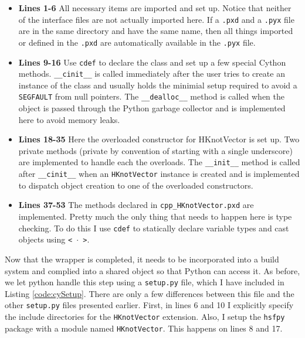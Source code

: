     

    \begin{itemize}
      \item \textbf{Lines 1-6} All necessary items are imported and set up. Notice that neither of the interface files are not actually imported here. If a \texttt{.pxd} and a \texttt{.pyx} file are in the same directory and have the same name, then all things imported or defined in the \texttt{.pxd} are automatically available in the \texttt{.pyx} file.
      \item \textbf{Lines 9-16} Use \texttt{cdef} to declare the class and set up a few special Cython methods. \texttt{\_\_cinit\_\_} is called immediately after the user tries to create an instance of the class and usually holds the minimial setup required to avoid  a \texttt{SEGFAULT} from null pointers. The \texttt{\_\_dealloc\_\_} method is called when the object is passed through the Python garbage collector and is implemented here to avoid memory leaks.
      \item \textbf{Lines 18-35} Here the overloaded constructor for HKnotVector is set up. Two private methods (private by convention of starting with a single underscore) are implemented to handle each the overloads. The \texttt{\_\_init\_\_} method is called after \texttt{\_\_cinit\_\_} when an \texttt{HKnotVector} instance is created and is implemented to dispatch object creation to one of the overloaded constructors.
      \item \textbf{Lines 37-53} The methods declared in \texttt{cpp\_HKnotVector.pxd} are implemented. Pretty much the only thing that needs to happen here is type checking. To do this I use \texttt{cdef} to statically declare variable types and cast objects using \texttt{< $\cdot$ >}.
    \end{itemize}
    \mainstretch{}

    Now that the wrapper is completed, it needs to be incorporated into a build system and complied into a shared object so that Python can access it. As before, we let python handle this step using a \texttt{setup.py} file, which I have included in Listing \ref{code:cySetup}. There are only a few differences between this file and the other \texttt{setup.py} files presented earlier. First, in lines 6 and 10 I explicitly specify the include directories for the \texttt{HKnotVector} extension. Also, I setup the \texttt{hsfpy} package with a module named \texttt{HKnotVector}. This happens on lines 8 and 17.

